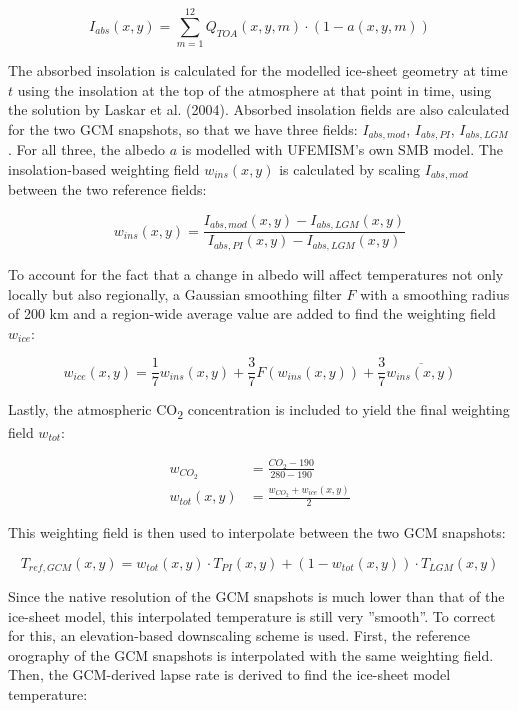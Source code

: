 \documentclass{article}
\begin{document}
\begin{equation} \label{eq:matrix_Iabs}
I_{abs}(x,y) = \sum_{m=1}^{12} Q_{TOA} (x,y,m) \cdot (1 - a( x,y,m))
\end{equation}

The absorbed insolation is calculated for the modelled ice-sheet geometry at time $t$ using the insolation at the top of the atmosphere at that point in time, using the solution by Laskar et al. (2004). Absorbed insolation fields are also calculated for the two GCM snapshots, so that we have three fields: $I_{abs,mod}$, $I_{abs,PI}$, $I_{abs,LGM}$. For all three, the albedo $a$ is modelled with UFEMISM's own SMB model. The insolation-based weighting field $w_{ins}(x,y)$ is calculated by scaling $I_{abs,mod}$ between the two reference fields:

\begin{equation} \label{eq:matrix_wins_T2m}
w_{ins}(x,y) = \frac{I_{abs,mod}(x,y) - I_{abs,LGM}(x,y)}{I_{abs,PI}(x,y) - I_{abs,LGM}(x,y)}
\end{equation}

To account for the fact that a change in albedo will affect temperatures not only locally but also regionally, a Gaussian smoothing filter $F$ with a smoothing radius of 200 km and a region-wide average value are added to find the weighting field $w_{ice}$:

\begin{equation} \label{eq:matrix_wice_T2m}
w_{ice}(x,y) = \frac{1}{7} w_{ins}(x,y) + \frac{3}{7} F \left( w_{ins}(x,y) \right) + \frac{3}{7} \overline{w_{ins}(x,y)}
\end{equation}

Lastly, the atmospheric CO\textsubscript{2} concentration is included to yield the final weighting field $w_{tot}$:

\begin{align}
w_{CO_2} &= \frac{CO_2 - 190}{280 - 190}\\
w_{tot}(x,y) &= \frac{w_{CO_2} + w_{ice}(x,y)}{2}
\end{align}

This weighting field is then used to interpolate between the two GCM snapshots:

\begin{equation}
T_{ref,GCM}(x,y) = w_{tot} (x,y) \cdot T_{PI} (x,y) + \left( 1 - w_{tot} (x,y) \right) \cdot T_{LGM} (x,y)
\end{equation}

Since the native resolution of the GCM snapshots is much lower than that of the ice-sheet model, this interpolated temperature is still very ''smooth''. To correct for this, an elevation-based downscaling scheme is used. First, the reference orography of the GCM snapshots is interpolated with the same weighting field. Then, the GCM-derived lapse rate is derived to find the ice-sheet model temperature:
\end{document}

